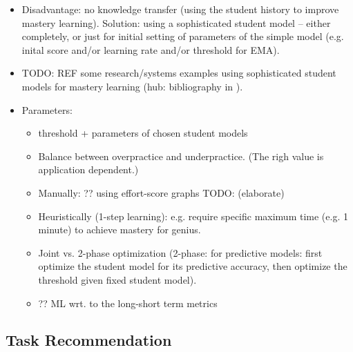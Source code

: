 \begin{itemize}
\item Disadvantage: no knowledge transfer (using the student history to improve
  mastery learning). Solution: using a sophisticated student model -- either completely,
  or just for initial setting of parameters of the simple model
  (e.g. inital score and/or learning rate and/or threshold for EMA).
\item TODO: REF some research/systems examples using sophisticated student models
  for mastery learning (hub: bibliography in \cite{alg.mastery}).
\item Parameters:
\begin{itemize}
\item threshold + parameters of chosen student models
\item Balance between overpractice and underpractice. (The righ value is application dependent.)
\item Manually: ?? using effort-score graphs \cite{alg.mastery} TODO: (elaborate)
\item Heuristically (1-step learning): e.g. require specific maximum time (e.g. 1 minute)
  to achieve mastery for genius.
\item Joint vs. 2-phase optimization
  (2-phase: for predictive models: first optimize the student model for its
  predictive accuracy, then optimize the threshold given fixed student model).
\item ?? ML wrt. to the long-short term metrics
\end{itemize}
\end{itemize}


\subsection{Task Recommendation}  %
\label{sec:task-recommendation}

